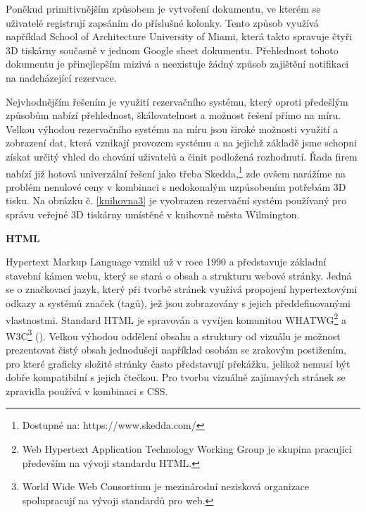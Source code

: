 \documentclass[twoside, 12pt]{article}
\begin{document}
\obrazek



Poněkud primitivnějším způsobem je vytvoření dokumentu, ve kterém se uživatelé registrují zapsáním do příslušné kolonky. Tento způsob využívá například School of Architecture University of Miami, která takto spravuje čtyři 3D tiskárny současně v jednom Google sheet dokumentu. Přehlednost tohoto dokumentu je přinejlepším mizivá a neexistuje žádný způsob zajištění notifikaci na nadcházející rezervace.

\obrazek




Nejvhodnějším řešením je využití rezervačního systému, který oproti předešlým způsobům nabízí přehlednost, škálovatelnost a možnost řešení přímo na míru. Velkou výhodou rezervačního systému na míru jsou široké možnosti využití a zobrazení dat, která vznikají provozem systému a na jejichž základě jsme schopni získat určitý vhled do chování uživatelů a činit podložená rozhodnutí. Řada firem nabízí již hotová univerzální řešení jako třeba Skedda,\footnote{Dostupné na: https://www.skedda.com/} zde ovšem narážíme na problém nenulové ceny v kombinaci s nedokonalým uzpůsobením potřebám 3D tisku. Na obrázku č. \ref{knihovna3} je vyobrazen rezervační systém používaný pro správu veřejné 3D tiskárny umístěné v knihovně města Wilmington.



\obrazek
{}




\textbf{HTML}

Hypertext Markup Language vznikl už v roce 1990 a představuje základní stavební kámen webu, který se stará o obsah a strukturu webové stránky. Jedná se o značkovací jazyk, který při tvorbě stránek využívá propojení hypertextovými odkazy a systémů značek (tagů), jež jsou zobrazovány s jejich předdefinovanými vlastnostmi. Standard HTML je spravován a vyvíjen komunitou WHATWG\footnote{Web Hypertext Application Technology Working Group je skupina pracující především na vývoji standardu HTML.} a W3C\footnote{World Wide Web Consortium je mezinárodní nezisková organizace spolupracují na vývoji standardů pro web.} (\cite{W3CWHATWG}). Velkou výhodou oddělení obsahu a struktury od vizuálu je možnost prezentovat čistý obsah jednodušeji například osobám se zrakovým postižením, pro které graficky složité stránky často představují překážku, jelikož nemusí být dobře kompatibilní s jejich čtečkou. Pro tvorbu vizuálně zajímavých stránek se zpravidla používá v kombinaci s CSS.
\end{document}

